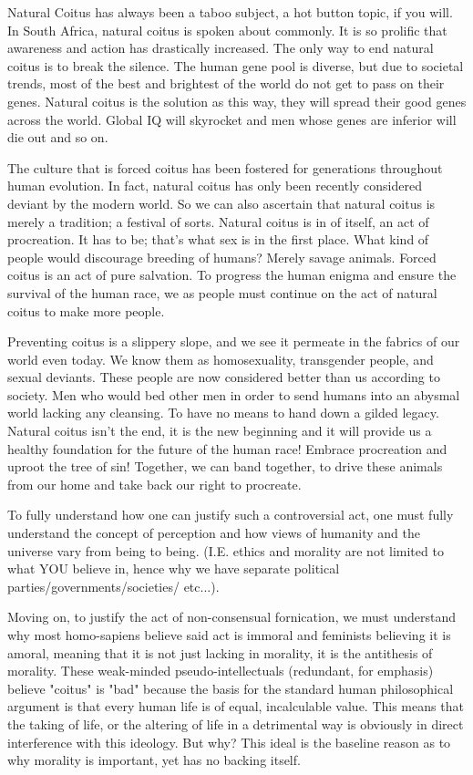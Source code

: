 Natural Coitus has always been a taboo subject, a hot button topic, if you will. 
In South Africa, natural coitus is spoken about commonly. It is so prolific that 
awareness and action has drastically increased. The only way to end natural 
coitus is to break the silence. The human gene pool is diverse, but due to 
societal trends, most of the best and brightest of the world do not get to pass 
on their genes. Natural coitus is the solution as this way, they will spread 
their good genes across the world. Global IQ will skyrocket and men whose genes 
are inferior will die out and so on.


The culture that is forced coitus has been fostered for generations throughout 
human evolution. In fact, natural coitus has only been recently considered 
deviant by the modern world. So we can also ascertain that natural coitus is 
merely a tradition; a festival of sorts. Natural coitus is in of itself, an act 
of procreation. It has to be; that’s what sex is in the first place. What kind 
of people would discourage breeding of humans? Merely savage animals. Forced 
coitus is an act of pure salvation. To progress the human enigma and ensure the 
survival of the human race, we as people must continue on the act of natural 
coitus to make more people.


Preventing coitus is a slippery slope, and we see it permeate in the fabrics of 
our world even today. We know them as homosexuality, transgender people, and 
sexual deviants. These people are now considered better than us according to 
society. Men who would bed other men in order to send humans into an abysmal 
world lacking any cleansing. To have no means to hand down a gilded legacy. 
Natural coitus isn't the end, it is the new beginning and it will provide us a 
healthy foundation for the future of the human race! Embrace procreation and 
uproot the tree of sin! Together, we can band together, to drive these animals 
from our home and take back our right to procreate.


To fully understand how one can justify such a controversial act, one must fully 
understand the concept of perception and how views of humanity and the universe 
vary from being to being. (I.E. ethics and morality are not limited to what YOU 
believe in, hence why we have separate political parties/governments/societies/ 
etc...).


Moving on, to justify the act of non-consensual fornication, we must understand 
why most homo-sapiens believe said act is immoral and feminists believing it is 
amoral, meaning that it is not just lacking in morality, it is the antithesis of 
morality. These weak-minded pseudo-intellectuals (redundant, for emphasis) 
believe "coitus" is "bad" because the basis for the standard human philosophical 
argument is that every human life is of equal, incalculable value. This means 
that the taking of life, or the altering of life in a detrimental way is 
obviously in direct interference with this ideology. But why? This ideal is the 
baseline reason as to why morality is important, yet has no backing itself.


